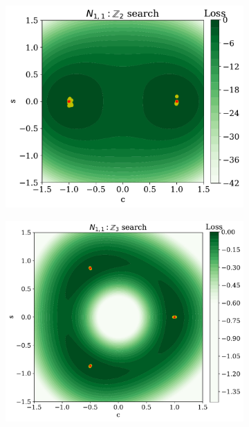 \begin{figure}
    \centering
    \begin{subfigure}[b]{0.31\textwidth}
        \centering
        \includegraphics[width=\textwidth]{figures/chapter-09/C2MSE.pdf}
        \caption{}
        \label{fig:MSE_i}
    \end{subfigure}
    \hfill
    \begin{subfigure}[b]{0.31\textwidth}
        \centering
        \includegraphics[width=\textwidth]{figures/chapter-09/C3MSE.pdf}

\end{subfigure}
\end{figure}
